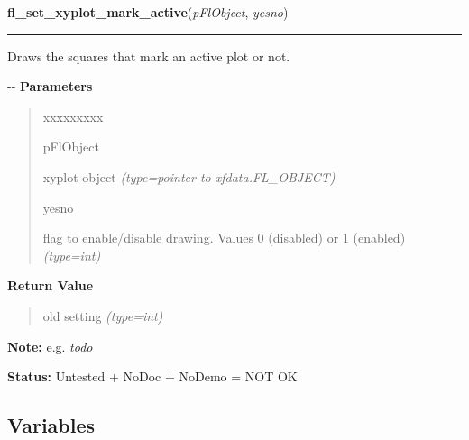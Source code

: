 \hspace{.8\funcindent}\begin{boxedminipage}{\funcwidth}

    \raggedright \textbf{fl\_set\_xyplot\_mark\_active}(\textit{pFlObject}, \textit{yesno})

    \vspace{-1.5ex}

    \rule{\textwidth}{0.5\fboxrule}
\setlength{\parskip}{2ex}

Draws the squares that mark an active plot or not.

-{}-
\setlength{\parskip}{1ex}
      \textbf{Parameters}
      \vspace{-1ex}

      \begin{quote}
        \begin{Ventry}{xxxxxxxxx}

          \item[pFlObject]


xyplot object
            {\it (type=pointer to xfdata.FL\_OBJECT)}

          \item[yesno]


flag to enable/disable drawing. Values 0 (disabled) or 1 (enabled)
            {\it (type=int)}

        \end{Ventry}

      \end{quote}

      \textbf{Return Value}
    \vspace{-1ex}

      \begin{quote}

old setting
      {\it (type=int)}

      \end{quote}

\textbf{Note:} 
e.g. \emph{todo}


\textbf{Status:} 
Untested + NoDoc + NoDemo = NOT OK


    \end{boxedminipage}



  \subsection{Variables}

